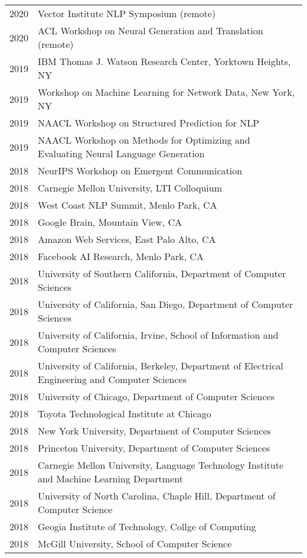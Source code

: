 \documentclass[a4paper,11pt]{article}
\begin{document}
\begin{longtable}{rl}
    2020 & Vector Institute NLP Symposium (remote) \\
    2020 & ACL Workshop on Neural Generation and Translation (remote) \\
    2019 & IBM Thomas J. Watson Research Center, Yorktown Heights, NY \\
    2019 & Workshop on Machine Learning for Network Data, New York, NY \\
    2019 & NAACL Workshop on Structured Prediction for NLP \\
    2019 & NAACL Workshop on Methods for Optimizing and Evaluating Neural Language Generation \\
    2018 & NeurIPS Workshop on Emergent Communication \\
    2018 & Carnegie Mellon University, LTI Colloquium \\
    2018 & West Coast NLP Summit, Menlo Park, CA \\
    2018 & Google Brain, Mountain View, CA \\
    2018 & Amazon Web Services, East Palo Alto, CA \\
    2018 & Facebook AI Research, Menlo Park, CA \\
    2018 & University of Southern California, Department of Computer Sciences \\
    2018 & University of California, San Diego, Department of Computer Sciences \\
    2018 & University of California, Irvine, School of Information and Computer Sciences \\
    2018 & University of California, Berkeley, Department of Electrical Engineering and Computer Sciences \\
    2018 & University of Chicago, Department of Computer Sciences \\
    2018 & Toyota Technological Institute at Chicago \\
    2018 & New York University, Department of Computer Sciences \\
    2018 & Princeton University, Department of Computer Sciences \\
    2018 & Carnegie Mellon University, Language Technology Institute and Machine Learning Department \\
    2018 & University of North Carolina, Chaple Hill, Department of Computer Science \\
    2018 & Geogia Institute of Technology, Collge of Computing \\
    2018 & McGill University, School of Computer Science \\

\end{longtable}
\end{document}
